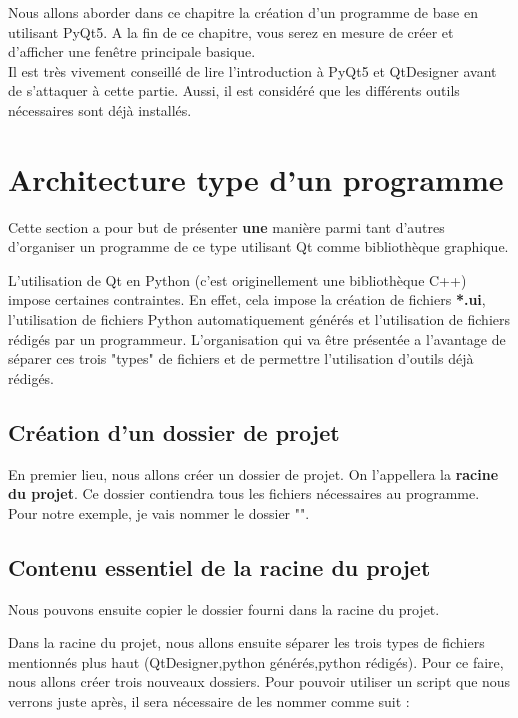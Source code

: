 {Nous allons aborder dans ce chapitre la création d'un programme de base en utilisant PyQt5. A la fin de ce chapitre, vous serez en mesure de créer et d'afficher une fenêtre principale basique.\\

Il est très vivement conseillé de lire l'introduction à PyQt5 et QtDesigner avant de s'attaquer à cette partie. Aussi, il est considéré que les différents outils nécessaires sont déjà installés.



\section{Architecture type d'un programme}

Cette section a pour but de présenter \textbf{une} manière parmi tant d'autres d'organiser un programme de ce type utilisant Qt comme bibliothèque graphique.

L'utilisation de Qt en Python (c'est originellement une bibliothèque C++) impose certaines contraintes. En effet, cela impose la création de fichiers \textbf{*.ui}, l'utilisation de fichiers Python automatiquement générés et l'utilisation de fichiers rédigés par un programmeur.\newline
L'organisation qui va être présentée a l'avantage de séparer ces trois "types" de fichiers et de permettre l'utilisation d'outils déjà rédigés.

\subsection{Création d'un dossier de projet}

En premier lieu, nous allons créer un dossier de projet. On l'appellera la \textbf{racine du projet}. Ce dossier contiendra tous les fichiers nécessaires au programme.\newline
Pour notre exemple, je vais nommer le dossier "".\newline

\subsection{Contenu essentiel de la racine du projet}

Nous pouvons ensuite copier le dossier  fourni dans la racine du projet.\newline

Dans la racine du projet, nous allons ensuite séparer les trois types de fichiers mentionnés plus haut (QtDesigner,python générés,python rédigés). Pour ce faire, nous allons créer  trois nouveaux dossiers. Pour pouvoir utiliser un script que nous verrons juste après, il sera nécessaire de les nommer comme suit :
\begin{enumerate}


\end{enumerate}}
